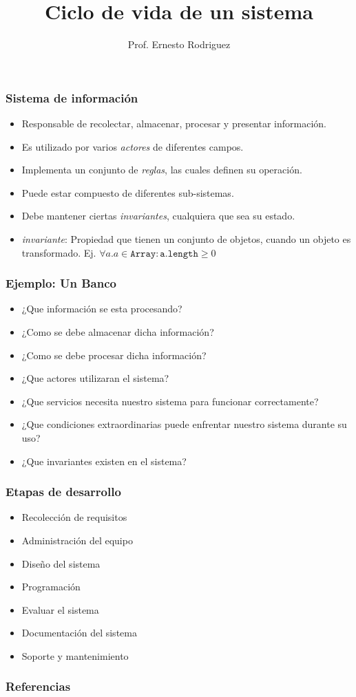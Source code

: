 \documentclass{beamer}
\title[Ciclo de vida]{Ciclo de vida de un sistema}
\author{Prof. Ernesto Rodriguez}
\institute{
    Universidad del Itsmo \\
    \medskip \textit{erodriguez@unis.edu.gt}
}
\date[\today]{}
\begin{document}
\begin{frame}
\titlepage
\end{frame}

\begin{frame}
    \frametitle{Sistema de informaci\'on}
    \begin{itemize}
        \item{Responsable de recolectar, almacenar, procesar y presentar informaci\'on.}
        \item{Es utilizado por varios \emph{actores} de diferentes campos.}
        \item{Implementa un conjunto de \emph{reglas}, las cuales definen su operaci\'on.}
        \item{Puede estar compuesto de diferentes sub-sistemas.}
        \item{Debe mantener ciertas \emph{invariantes}, cualquiera que sea su estado.}
        \item{\emph{invariante}: Propiedad que tienen un conjunto de objetos, cuando un objeto es transformado. Ej. $\forall a . a \in \mathtt{Array}:\mathtt{a.length} \geq 0$ }
    \end{itemize}

\end{frame}

\begin{frame}
    \frametitle{Ejemplo: Un Banco}
    \begin{itemize}
        \item{¿Que información se esta procesando?}
        \item{¿Como se debe almacenar dicha informaci\'on?}
        \item{¿Como se debe procesar dicha informaci\'on?}
        \item{¿Que actores utilizaran el sistema?}
        \item{¿Que servicios necesita nuestro sistema para funcionar correctamente?}
        \item{¿Que condiciones extraordinarias puede enfrentar nuestro sistema durante su uso?}
        \item{¿Que invariantes existen en el sistema?}
    \end{itemize}
\end{frame}

\begin{frame}
\frametitle{Etapas de desarrollo}
\begin{itemize}
    \item Recolecci\'on de requisitos
    \item Administraci\'on del equipo
    \item Dise\~no del sistema
    \item Programaci\'on
    \item Evaluar el sistema
    \item Documentaci\'on del sistema
    \item Soporte y mantenimiento
\end{itemize}
\end{frame}

\begin{frame}
\end{frame}

\begin{frame}
\frametitle{Referencias}


\end{frame}
\end{document}
